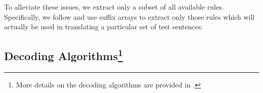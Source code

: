 \documentclass[11pt]{article}
\begin{document}

To alleviate these issues, we extract only a subset of all available rules. Specifically, we follow  and use suffix arrays to extract only those rules which will actually be used in translating a particular set of test sentences. 


%







\subsection{Decoding Algorithms\footnote{More details on the decoding algorithms are provided in \cite{Li2008b}.}}
\end{document}
